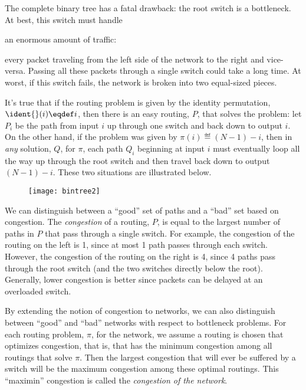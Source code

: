 The complete binary tree has a fatal drawback: the root switch is a
bottleneck.  At best, this switch must handle \begin{editingnotes}
an enormous amount of
traffic:
\end{editingnotes} every packet traveling from the left side of the network to the
right and vice-versa.  Passing all these packets through a single switch
could take a long time.  At worst, if this switch fails, the network is
broken into two equal-sized pieces.

It's true that if the routing problem is given by the identity permutation,
$\ident{}(i) \eqdef i$, then there is an easy routing, $P$, that solves
the problem: let $P_i$ be the path from input $i$ up through one switch
and back down to output $i$.  On the other hand, if the problem was given
by $\pi(i) \eqdef (N - 1) - i$, then in \emph{any} solution, $Q$, for
$\pi$, each path $Q_i$ beginning at input $i$ must eventually loop all
the way up through the root switch and then travel back down to output $(N
- 1) - i$.  These two situations are illustrated below.
\begin{figure}
\texttt{[image: bintree2]}
\end{figure}
We can distinguish between a ``good'' set of paths and a ``bad'' set based
on congestion.  The \emph{congestion}%
of a routing, $P$, is equal to the
largest number of paths in $P$ that pass through a single switch.  For
example, the congestion of the routing on the left is 1, since at most 1
path passes through each switch.  However, the congestion of the routing
on the right is 4, since 4 paths pass through the root switch (and the two
switches directly below the root).  Generally, lower congestion is better
since packets can be delayed at an overloaded switch.

By extending the notion of congestion to networks, we can also distinguish
between ``good'' and ``bad'' networks with respect to bottleneck problems.
For each routing problem, $\pi$, for the network, we assume a routing is
chosen that optimizes congestion, that is, that has the minimum congestion
among all routings that solve $\pi$.  Then the largest congestion that
will ever be suffered by a switch will be the maximum congestion among
these optimal routings.  This ``maximin'' congestion is called the
\emph{congestion of the network}.

